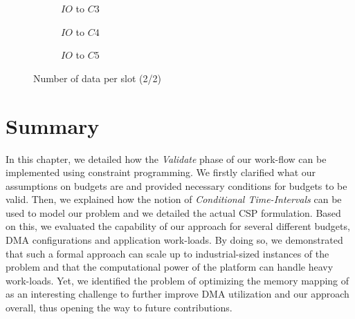 \documentclass[main.tex]{subfiles}
\begin{document}
\begin{figure}
    \begin{subfigure}[b]{0.3\textwidth}  \caption{\PC{} $IO$ to $C3$} \end{subfigure} 
    \begin{subfigure}[b]{0.3\textwidth}  \caption{\PC{} $IO$ to $C4$} \end{subfigure} 
    \begin{subfigure}[b]{0.3\textwidth}  \caption{\PC{} $IO$ to $C5$} \end{subfigure}

    \caption{Number of data per \PC{} slot (2/2)}
    \label{fig_validation_expePcUtilsNbbufs2}
\end{figure}


\clearpage
\section{Summary}
In this chapter, we detailed how the \emph{Validate} phase of our work-flow can
be implemented using constraint programming. We firstly clarified what our
assumptions on budgets are and provided necessary conditions for budgets to be
valid. Then, we explained how the notion of \emph{Conditional Time-Intervals}
can be used to model our problem and we detailed the actual CSP formulation.
Based on this, we evaluated the capability of our approach for several
different budgets, DMA configurations and application work-loads. By doing so,
we demonstrated that such a formal approach can scale up to industrial-sized
instances of the problem and that the computational power of the platform can
handle heavy work-loads. Yet, we identified the problem of optimizing the
memory mapping of as an interesting challenge to further improve DMA
utilization and our approach overall, thus opening the way to future
contributions.

\clearpage
\subbiblio
\end{document}
